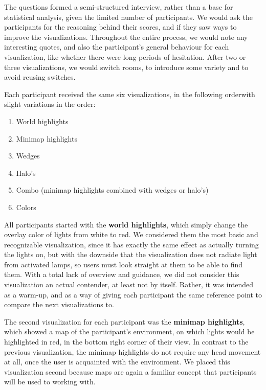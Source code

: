 The questions formed a semi-structured interview, rather than a base for statistical analysis, given the limited number of participants. We would ask the participants for the reasoning behind their scores, and if they saw ways to improve the visualizations. Throughout the entire process, we would note any interesting quotes, and also the participant's general behaviour for each visualization, like whether there were long periods of hesitation. After two or three visualizations, we would switch rooms, to introduce some variety and to avoid reusing switches.

Each participant received the same six visualizations, in the following orderwith slight variations in the order:
\begin{enumerate}
  \item World highlights
  \item Minimap highlights
  \item Wedges
  \item Halo's
  \item Combo (minimap highlights combined with wedges or halo's)
  \item Colors
\end{enumerate}

All participants started with the \textbf{world highlights}, which simply change the overlay color of lights from white to red. We considered them the most basic and recognizable visualization, since it has exactly the same effect as actually turning the lights on, but with the downside that the visualization does not radiate light from activated lamps, so users must look straight at them to be able to find them. With a total lack of overview and guidance, we did not consider this visualization an actual contender, at least not by itself. Rather, it was intended as a warm-up, and as a way of giving each participant the same reference point to compare the next visualizations to.

The second visualization for each participant was the \textbf{minimap highlights}, which showed a map of the participant's environment, on which lights would be highlighted in red, in the bottom right corner of their view. In contrast to the previous visualization, the minimap highlights do not require any head movement at all, once the user is acquainted with the environment. We placed this visualization second because maps are again a familiar concept that participants will be used to working with.

